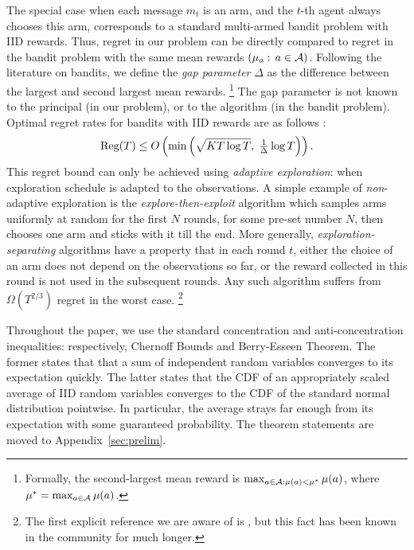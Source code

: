 The special case when each message $m_t$ is an arm, and the $t$-th agent always chooses this arm, corresponds to a standard multi-armed bandit problem with IID rewards. Thus, regret in our problem can be directly compared to regret in the bandit problem with the same mean rewards $(\mu_a:\,a\in\mathcal{A})$. Following the literature on bandits, we define the \emph{gap parameter} $\Delta$ as the difference between the largest and second largest mean rewards.%
\footnote{Formally, the second-largest mean reward is
    $\max_{a\in\mathcal{A}:\mu(a)<\mu^*} \mu(a)$,
where $\mu^* = \max_{a\in\mathcal{A}} \mu(a)$.
}
The gap parameter is not known to the principal (in our problem), or to the algorithm (in the bandit problem). Optimal regret rates for bandits with IID rewards are as follows \cite{bandits-ucb1,bandits-exp3,Lai-Robbins-85}:
\begin{align}\label{eq:model-OptRegret}
\mathrm{Reg}(T) \leq O\left(\min\left(
    \sqrt{KT\log T},\; \tfrac{1}{\Delta} \log T
    \right)\right).
\end{align}
This regret bound can only be achieved using \emph{adaptive exploration}: \ie when exploration schedule is adapted to the observations. A simple example of \emph{non}-adaptive exploration is the \emph{explore-then-exploit} algorithm which samples arms uniformly at random for the first $N$ rounds, for some pre-set number $N$, then chooses one arm and sticks with it till the end. More generally,
\emph{exploration-separating} algorithms have a property that in each round $t$, either the choice of an arm does not depend on the observations so far, or the reward collected in this round is not used in the subsequent rounds. Any such algorithm suffers from $\Omega(T^{2/3})$ regret in the worst case.%
\footnote{The first explicit reference we are aware of is \cite{MechMAB-ec09,DevanurK09}, but this fact has been known in the community for much longer.}


Throughout the paper, we use the standard concentration and anti-concentration inequalities: respectively, Chernoff Bounds and Berry-Esseen Theorem. The former states that that a sum of independent random variables converges to its expectation quickly. The latter states that the CDF of an appropriately scaled average of IID random variables converges to the CDF of the standard normal distribution pointwise. In particular, the average strays far enough from its expectation with some guaranteed probability. The theorem statements are moved to Appendix~\ref{sec:prelim}.

